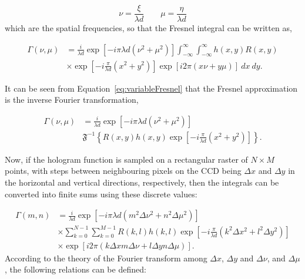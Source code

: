    \begin{equation}
        \nu = \frac{\xi}{\lambda d} \qquad \mu = \frac{\eta}{\lambda d}
        \label{eq:original}
    \end{equation}
    which are the spatial frequencies, so that the Fresnel integral can be
    written as,

    \begin{equation}
        \begin{aligned}
        \Gamma(\nu,\mu) &= \frac{i}{\lambda d}
        \exp\left[ -i\pi\lambda d(\nu^2+\mu^2) \right] 
        \int_{-\infty}^{\infty}\int_{-\infty}^{\infty}h(x,y)R(x,y) \\
        &\times \exp\left[ -i\frac{\pi}{\lambda d}\left(
        x^{2}+y^{2} \right) \right]
        \exp\left[ i2\pi\left(
        x\nu+y\mu \right) \right]~dx~dy.
        \end{aligned}
        \label{eq:variableFresnel}
    \end{equation}

    It can be seen from Equation~\ref{eq:variableFresnel} that the Fresnel approximation is the
    inverse Fourier transformation,

    \begin{equation}
    \begin{aligned}
        \Gamma(\nu,\mu)&=\frac{i}{\lambda d}\exp\left[ -i\pi\lambda d\left(
            \nu^2+\mu^2
        \right) \right] \\
        & \mathfrak{F}^{-1}\left\{R(x,y)h(x,y)\exp\left[
            -i\frac{\pi}{\lambda d}(x^{2}+y^2)
        \right] \right\} .
    \end{aligned}
    \label{eq:FFTneeded}
    \end{equation}

    Now, if the hologram function is sampled on a rectangular raster of $N\times M $
    points, with steps between neighbouring pixels on the CCD being $\Delta x$ and $\Delta
    y$ in the horizontal and vertical directions, respectively, then the
    integrals can be converted into finite sums using these discrete values:

    \begin{equation}
    \begin{aligned}
        \Gamma(m,n) &= \frac{i}{\lambda d}\exp\left[ -i\pi \lambda d\left(
            m^2\Delta \nu^2 + n^2\Delta \mu^2
        \right)\right]\\
        & \times
        \sum_{k=0}^{N-1}\sum_{k=0}^{M-1}R(k,l)h(k,l)\exp\left[ -i
        \frac{\pi}{\lambda d}\left( k^2\Delta x^2+l^2\Delta y^2 \right)
    \right] \\
    & \times \exp\left[ i2\pi\left( k\Delta x m \Delta\nu+l\Delta y n
    \Delta\mu \right) \right] .
    \end{aligned}
    \label{eq:discrete}
    \end{equation}
    According to the theory of the Fourier transform among $\Delta x$, $\Delta y$
    and $\Delta\nu$, and $\Delta\mu$, the following relations can be defined:

